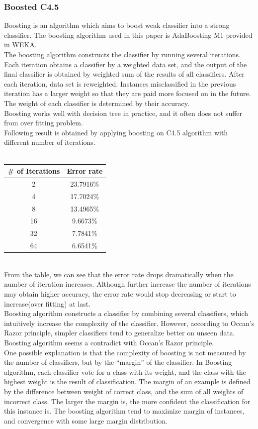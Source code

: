 \documentclass[a4paper,11pt]{article}
\begin{document}
\subsubsection{Boosted C4.5}
Boosting is an algorithm which aims to boost weak classifier into a strong classifier. The boosting algorithm used in this paper is AdaBoosting M1 provided in WEKA.\\
The boosting algorithm constructs the classifier by running several iterations. Each iteration obtains a classifier by a weighted data set, and the output of the final classifier is obtained by weighted sum of the results of all classifiers. After each iteration, data set is reweighted. Instances misclassified in the previous iteration has a larger weight so that they are paid more focused on in the future. The weight of each classifier is determined by their accuracy.\\
Boosting works well with decision tree in practice, and it often does not suffer from over fitting problem.\\
Following result is obtained by applying boosting on C4.5 algorithm with different number of iterations.\\
\vspace{0.5cm}\\
\begin{tabular}{c c}
\# of Iterations	& Error rate\\
\hline \hline
	2		& 23.7916\%\\
	4		& 17.7024\%\\
	8		& 13.4965\%\\
	16		& 9.6673\%\\
    32      & 7.7841\%\\
    64      & 6.6541\%\\
\end{tabular}
\vspace{0.5cm}\\
From the table, we can see that the error rate drops dramatically when the number of iteration increases. Although further increase the number of iterations may obtain higher accuracy, the error rate would stop decreasing or start to increase(over fitting) at last.\\
Boosting algorithm constructs a classifier by combining several classifiers, which intuitively increase the complexity of the classifier. However, according to Occan's Razor principle, simpler classifiers tend to generalize better on unseen data. Boosting algorithm seems a contradict with Occan's Razor principle.\\
One possible explanation is that the complexity of boosting is not measured by the number of classifiers, but by the ``margin'' of the classifier.
In Boosting algorithm, each classifier vote for a class with its weight, and the class with the highest weight is the result of classification. The margin of an example is defined by the difference between weight of correct class, and the sum of all weights of incorrect class. The larger the margin is, the more confident the classification for this instance is. The boosting algorithm tend to maximize margin of instances, and convergence with some large margin distribution\cite{boosting}.\\
\end{document}

